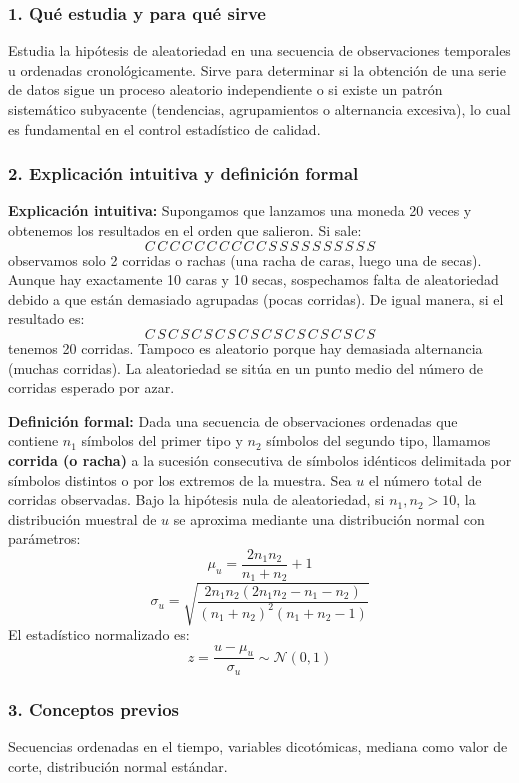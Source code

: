 \documentclass[11pt,a4paper]{article}
\begin{document}
\subsubsection{1. Qué estudia y para qué sirve}
Estudia la hipótesis de aleatoriedad en una secuencia de observaciones temporales u ordenadas cronológicamente. Sirve para determinar si la obtención de una serie de datos sigue un proceso aleatorio independiente o si existe un patrón sistemático subyacente (tendencias, agrupamientos o alternancia excesiva), lo cual es fundamental en el control estadístico de calidad.

\subsubsection{2. Explicación intuitiva y definición formal}
\textbf{Explicación intuitiva:} Supongamos que lanzamos una moneda 20 veces y obtenemos los resultados en el orden que salieron. Si sale:
\[ C\,C\,C\,C\,C\,C\,C\,C\,C\,C\,S\,S\,S\,S\,S\,S\,S\,S\,S\,S \]
observamos solo 2 corridas o rachas (una racha de caras, luego una de secas). Aunque hay exactamente 10 caras y 10 secas, sospechamos falta de aleatoriedad debido a que están demasiado agrupadas (pocas corridas). De igual manera, si el resultado es:
\[ C\,S\,C\,S\,C\,S\,C\,S\,C\,S\,C\,S\,C\,S\,C\,S\,C\,S\,C\,S \]
tenemos 20 corridas. Tampoco es aleatorio porque hay demasiada alternancia (muchas corridas). La aleatoriedad se sitúa en un punto medio del número de corridas esperado por azar.

\textbf{Definición formal:} Dada una secuencia de observaciones ordenadas que contiene $n_1$ símbolos del primer tipo y $n_2$ símbolos del segundo tipo, llamamos \textbf{corrida (o racha)} a la sucesión consecutiva de símbolos idénticos delimitada por símbolos distintos o por los extremos de la muestra. Sea $u$ el número total de corridas observadas. Bajo la hipótesis nula de aleatoriedad, si $n_1, n_2 > 10$, la distribución muestral de $u$ se aproxima mediante una distribución normal con parámetros:
\[ \mu_u = \frac{2 n_1 n_2}{n_1 + n_2} + 1 \]
\[ \sigma_u = \sqrt{\frac{2 n_1 n_2 (2 n_1 n_2 - n_1 - n_2)}{(n_1 + n_2)^2 (n_1 + n_2 - 1)}} \]
El estadístico normalizado es:
\[ z = \frac{u - \mu_u}{\sigma_u} \sim \mathcal{N}(0,1) \]

\subsubsection{3. Conceptos previos}
Secuencias ordenadas en el tiempo, variables dicotómicas, mediana como valor de corte, distribución normal estándar.
\end{document}
